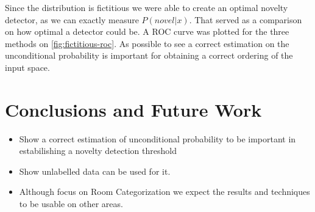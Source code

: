\documentclass[runningheads,a4paper]{llncs}
\begin{document}
Since the distribution is fictitious we were able to create an optimal novelty detector, as we can exactly measure $P(novel|x)$.
That served as a comparison on how optimal a detector could be.
A ROC curve was plotted for the three methods on \autoref{fig:fictitious-roc}.
As possible to see a correct estimation on the unconditional probability is important for obtaining a correct ordering of the
input space.






\section{Conclusions and Future Work}
\begin{itemize}
\item Show a correct estimation of unconditional probability to be important in estabilishing a novelty detection threshold
\item Show unlabelled data can be used for it.
\item Although focus on Room Categorization we expect the results and techniques to be usable on other areas.
\end{itemize}



\end{document}

